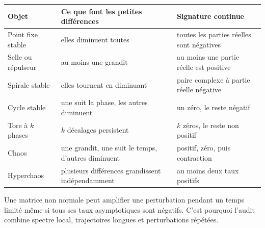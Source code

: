 \documentclass[11pt,a4paper]{article}
\theoremstyle{definition}
\begin{document}
\begin{center}
\begin{tabularx}{\textwidth}{YYY}
\toprule
Objet & Ce que font les petites différences & Signature continue \\
\midrule
Point fixe stable & elles diminuent toutes & toutes les parties réelles sont négatives \\
Selle ou répulseur & au moins une grandit & au moins une partie réelle est positive \\
Spirale stable & elles tournent en diminuant & paire complexe à partie réelle négative \\
Cycle stable & une suit la phase, les autres diminuent & un zéro, le reste négatif \\
Tore à $k$ phases & $k$ décalages persistent & $k$ zéros, le reste non positif \\
Chaos & une grandit, une suit le temps, d'autres diminuent & positif, zéro, puis contraction \\
Hyperchaos & plusieurs différences grandissent indépendamment & au moins deux taux positifs \\
\bottomrule
\end{tabularx}
\end{center}

Une matrice non normale peut amplifier une perturbation pendant un temps limité même si
tous ses taux asymptotiques sont négatifs. C'est pourquoi l'audit combine spectre local,
trajectoires longues et perturbations répétées.



\end{document}
